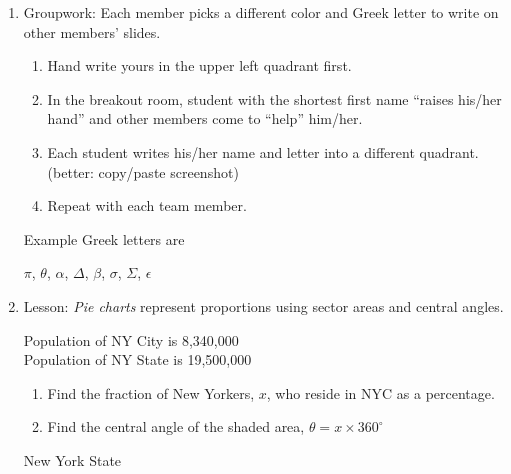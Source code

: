 \documentclass[12pt, twoside]{article}
\begin{document}
\begin{enumerate}
\newpage
\item Groupwork: Each member picks a different color and Greek letter to write on other members' slides. 
\begin{enumerate}
  \item Hand write yours in the upper left quadrant first.
  \item In the breakout room, student with the shortest first name ``raises his/her hand'' and other members come to ``help'' him/her.
  \item Each student writes his/her name and letter into a different quadrant. (better: copy/paste screenshot)
  \item Repeat with each team member.
\end{enumerate}
\begin{center}
\end{center}
Example Greek letters are 
{\Large$\pi$, $\theta$, $\alpha$, $\Delta$, $\beta$, $\sigma$, $\Sigma$, $\epsilon$ \par}

\newpage
\item Lesson: \emph{Pie charts} represent proportions using sector areas and central angles.
  \begin{multicols}{2}
  \raggedcolumns
  Population of NY City is 8,340,000\\
Population of NY State is 19,500,000
  \begin{enumerate}%
    \item Find the fraction of New Yorkers, $x$, who reside in NYC as a percentage. \vspace{2cm}
    \item Find the central angle of the shaded area, $\theta = x \times 360^\circ$
  \end{enumerate}
  \columnbreak
  \begin{flushright}
    New York State
  
\end{flushright}
  \end{multicols}


\end{enumerate}
\end{document}
